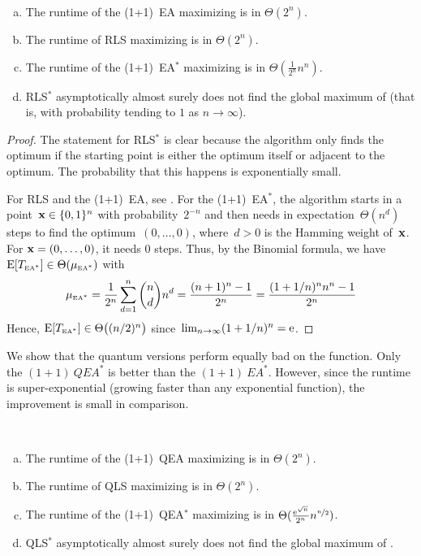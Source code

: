 \documentclass[a4paper,11pt]{article}
\begin{document}
\begin{theorem}\label{thm:needleclassic}~
\begin{enumerate}[(a)]
\item The runtime of the (1+1)~EA maximizing \needle is in $\Theta(2^n)$.
\item The runtime of RLS maximizing \needle is in $\Theta(2^n)$.
\item The runtime of the (1+1)~EA$^*$ maximizing \needle is in $\Theta(\frac{1}{2^n}n^{n})$.
\item RLS$^*$ asymptotically almost surely does not find the global maximum of \needle (that is, with probability tending to $1$ as $n\to\infty$). 
\end{enumerate}
\end{theorem}

\begin{proof}
The statement for RLS$^*$ is clear because the algorithm only finds the optimum if the starting point is either the optimum itself or adjacent to the optimum. The probability that this happens is exponentially small.

For RLS and the (1+1)~EA, see \cite{garnierKS99}. For the (1+1)~EA$^*$, the algorithm starts in a point~$\xvec\in\{0,1\}^n$ with probability~$2^{-n}$ and then needs in expectation~$\Theta(n^d)$ steps to find the optimum~$(0,\dots,0)$, where~$d>0$ is the Hamming weight of~$\xvec$. For $\xvec = (0,\dots,0)$, it needs $0$ steps. Thus, by the Binomial formula, we have $\operatorname{E}[T_{\text{\tiny\rm EA}^*}]\in\Theta(\mu_{\text{\tiny\rm EA}^*})$ with
\[
\mu_{\text{\tiny\rm EA}^*}=\frac{1}{2^n}\sum_{d=1}^n\binom{n}{d}n^{d}
=\frac{(n+1)^n-1}{2^n}
=\frac{(1+1/n)^n n^n-1}{2^n}
\]
Hence, $\operatorname{E}[T_{\text{\tiny\rm EA}^*}]\in\Theta\big((n/2)^n\big)$ since~$\lim_{n\to\infty}(1+1/n)^n=\mathrm{e}$.
\end{proof}


We show that the quantum versions perform equally bad on the \needle function. Only the $(1+1)~QEA^*$ is better than the $(1+1)~EA^*$. However, since the runtime is super-exponential (growing faster than any exponential function), the improvement is small in comparison.

\begin{theorem}\label{thm:needlequantum}~
\begin{enumerate}[(a)]
\item The runtime of the (1+1)~QEA maximizing \needle is in $\Theta(2^n)$.
\item The runtime of QLS maximizing \needle is in $\Theta(2^n)$.
\item The runtime of the (1+1)~QEA$^*$ maximizing \needle is in $\Theta(\frac{\mathrm{e}^{\sqrt{n}}}{2^n}n^{\nicefrac{n}{2}})$.
\item QLS$^*$ asymptotically almost surely does not find the global maximum of \needle.
\end{enumerate}
\end{theorem}
\end{document}
